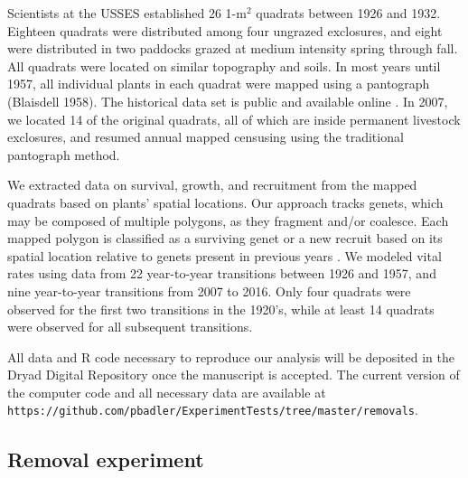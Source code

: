 \documentclass[11pt]{article}
\begin{document}
\begin{doublespacing}
Scientists at the USSES established 26 1-m$^2$ quadrats between 1926 and 1932. Eighteen quadrats were distributed among four ungrazed exclosures, and eight were distributed in two paddocks grazed at medium intensity spring through fall. All quadrats were located on similar topography and soils. In most years until 1957, all individual plants in each quadrat were mapped using a pantograph (Blaisdell 1958). The historical data set is public and available online \citep{zachmann_mapped_2010}. In 2007, we located 14 of the original quadrats, all of which are inside permanent livestock exclosures, and resumed annual mapped censusing using the traditional pantograph method. 

We extracted data on survival, growth, and recruitment from the mapped quadrats based on plants' spatial locations. Our approach tracks genets, which may be composed of multiple polygons, as they fragment and/or coalesce. Each mapped polygon is classified as a surviving genet or a new recruit based on its spatial location relative to genets present in previous years \citep{lauenroth_demography_2008}. We modeled vital rates using data from 22 year-to-year transitions between 1926 and 1957, and nine year-to-year transitions from 2007 to 2016. Only four quadrats were observed for the first two transitions in the 1920's, while at least 14 quadrats were observed for all subsequent transitions. 

All data and R code necessary to reproduce our analysis will be deposited in the Dryad Digital Repository once the manuscript is accepted. The current version of the computer code and all necessary data are available at \texttt{https://github.com/pbadler/ExperimentTests/tree/master/removals}.

\subsection*{Removal experiment}


\end{doublespacing}
\end{document}

